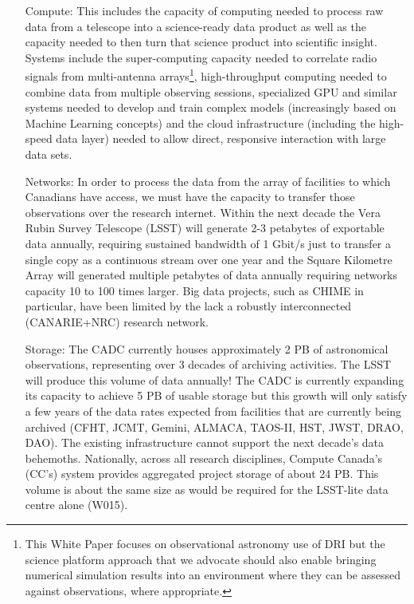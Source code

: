 \documentclass[11pt]{article}
\begin{document}
\begin{itemize}
    \item[Compute:] This includes the capacity of computing needed to process raw data from a telescope into a science-ready data product as well as the capacity needed to then turn that science product into scientific insight.  Systems include the super-computing capacity needed to correlate radio signals from multi-antenna arrays\footnote{This White Paper focuses on observational astronomy use of DRI but the science platform approach that we advocate should also enable bringing numerical simulation results into an environment where they can be assessed against observations, where appropriate.}, high-throughput computing needed to combine data from multiple observing sessions, specialized GPU and similar systems needed to develop and train complex models (increasingly based on Machine Learning concepts) and the cloud infrastructure (including the high-speed data layer) needed to allow direct, responsive interaction with large data sets.
    \item[Networks:] In order to process the data from the array of facilities to which Canadians have access, we must have the capacity to transfer those observations over the research internet.  Within the next decade the Vera Rubin Survey Telescope (LSST) will generate 2-3 petabytes of exportable data annually, requiring sustained bandwidth of 1 Gbit/s just to transfer a single copy as a continuous stream over one year and the Square Kilometre Array will generated multiple petabytes of data annually requiring networks capacity 10 to 100 times larger.  Big data projects, such as CHIME in particular, have been limited by the lack a robustly interconnected (CANARIE+NRC) research network.
    \item[Storage:] The CADC currently houses approximately 2 PB of astronomical observations, representing over 3 decades of archiving activities.  The LSST will produce this volume of data annually!  The CADC is currently expanding its capacity to achieve 5 PB of usable storage but this growth will only satisfy a few years of the data rates expected from facilities that are currently being archived (CFHT, JCMT, Gemini, ALMACA, TAOS-II, HST, JWST, DRAO, DAO).  The existing infrastructure cannot support the next decade's data behemoths.   Nationally, across all research disciplines, Compute Canada's (CC's) system provides aggregated project storage of about 24 PB. This volume is about the same size as would be required for the LSST-lite data centre alone (W015).

\end{itemize}
\end{document}
